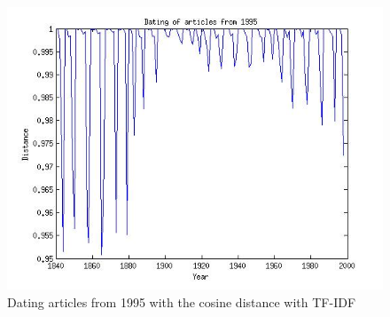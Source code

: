 \begin{figure}[H]
\begin{minipage}[b]{0.3\linewidth}
	\includegraphics[scale=0.25]{Pictures/date_articles/cos/dating1995_tfidf.jpg}
        \caption{Dating articles from 1995 with the cosine distance with TF-IDF}
        \label{date_cos_tfidf1}
    \end{minipage}
\end{figure}
